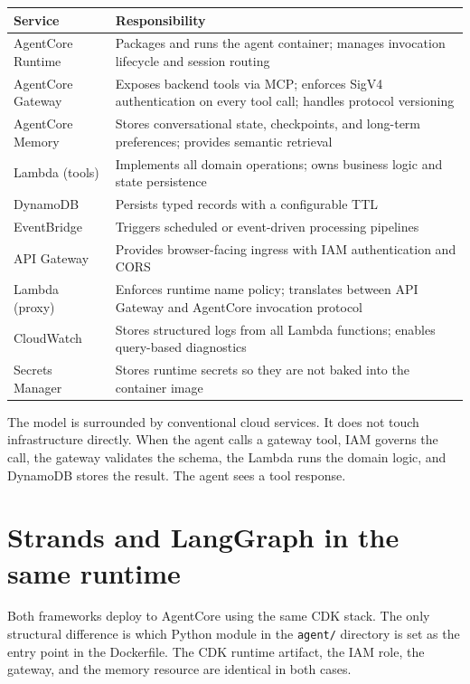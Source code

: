\begin{longtable}{p{}p{}}
\toprule
\textbf{Service} & \textbf{Responsibility} \\
\midrule
AgentCore Runtime
    & Packages and runs the agent container; manages invocation
      lifecycle and session routing \\
\addlinespace
AgentCore Gateway
    & Exposes backend tools via MCP; enforces SigV4
      authentication on every tool call; handles protocol
      versioning \\
\addlinespace
AgentCore Memory
    & Stores conversational state, checkpoints, and long-term
      preferences; provides semantic retrieval \\
\addlinespace
Lambda (tools)
    & Implements all domain operations; owns business logic
      and state persistence \\
\addlinespace
DynamoDB
    & Persists typed records with a configurable TTL \\
\addlinespace
EventBridge
    & Triggers scheduled or event-driven processing pipelines \\
\addlinespace
API Gateway
    & Provides browser-facing ingress with IAM authentication
      and CORS \\
\addlinespace
Lambda (proxy)
    & Enforces runtime name policy; translates between API
      Gateway and AgentCore invocation protocol \\
\addlinespace
CloudWatch
    & Stores structured logs from all Lambda functions; enables
      query-based diagnostics \\
\addlinespace
Secrets Manager
    & Stores runtime secrets so they are not baked into the
      container image \\
\bottomrule
\end{longtable}

The model is surrounded by conventional cloud services. It does not touch infrastructure
directly. When the agent calls a gateway tool, IAM governs the call, the gateway
validates the schema, the Lambda runs the domain logic, and DynamoDB stores the result.
The agent sees a tool response.

\section{Strands and LangGraph in the same runtime}

Both frameworks deploy to AgentCore using the same CDK stack. The only structural
difference is which Python module in the \texttt{agent/} directory is set as the entry
point in the Dockerfile. The CDK runtime artifact, the IAM role, the gateway, and the
memory resource are identical in both cases.

